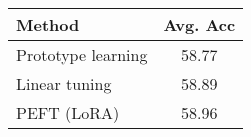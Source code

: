\begin{tabular}{l c}
\midrule
\textbf{Method} & \textbf{Avg. Acc} \\ \midrule
Prototype learning & 58.77 \\
Linear tuning & 58.89 \\
PEFT (LoRA) & 58.96 \\
\bottomrule
\end{tabular}
